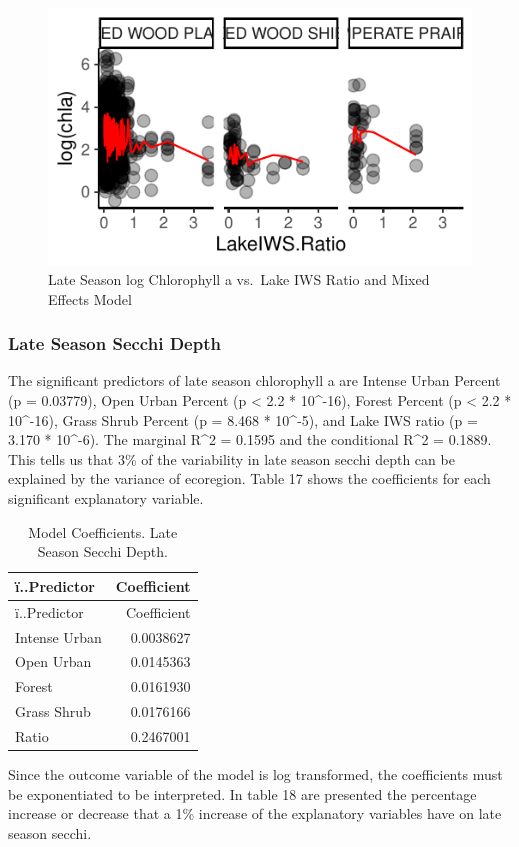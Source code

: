 \documentclass[12pt,]{article}
\begin{document}
\begin{figure}
\centering
\includegraphics{Bollt_Greif_Raby_Roth_Project_Final_files/figure-latex/unnamed-chunk-31-1.pdf}
\caption{Late Season log Chlorophyll a vs.~Lake IWS Ratio and Mixed
Effects Model}
\end{figure}

\hypertarget{late-season-secchi-depth}{%
\subsubsection{Late Season Secchi
Depth}\label{late-season-secchi-depth}}

The significant predictors of late season chlorophyll a are Intense
Urban Percent (p = 0.03779), Open Urban Percent (p \textless{} 2.2 *
10\^{}-16), Forest Percent (p \textless{} 2.2 * 10\^{}-16), Grass Shrub
Percent (p = 8.468 * 10\^{}-5), and Lake IWS ratio (p = 3.170 *
10\^{}-6). The marginal R\^{}2 = 0.1595 and the conditional R\^{}2 =
0.1889. This tells us that 3\% of the variability in late season secchi
depth can be explained by the variance of ecoregion. Table 17 shows the
coefficients for each significant explanatory variable.

\begin{longtable}[]{@{}lr@{}}
\caption{Model Coefficients. Late Season Secchi Depth.}\tabularnewline
\toprule
ï..Predictor & Coefficient\tabularnewline
\midrule
\endfirsthead
\toprule
ï..Predictor & Coefficient\tabularnewline
\midrule
\endhead
Intense Urban & 0.0038627\tabularnewline
Open Urban & 0.0145363\tabularnewline
Forest & 0.0161930\tabularnewline
Grass Shrub & 0.0176166\tabularnewline
Ratio & 0.2467001\tabularnewline
\bottomrule
\end{longtable}

Since the outcome variable of the model is log transformed, the
coefficients must be exponentiated to be interpreted. In table 18 are
presented the percentage increase or decrease that a 1\% increase of the
explanatory variables have on late season secchi.
\end{document}
